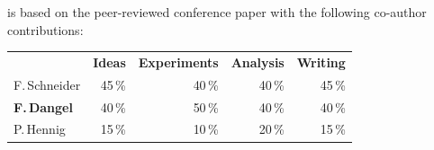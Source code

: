 \begin{disclaimer}
   is based on the peer-reviewed
  conference paper with the following co-author contributions:

   \cite{schneider2021cockpit}

  \vspace{-1.75ex}

  \begin{center}
    \begin{tabular}[!h]{lrrrr}
      & \textbf{Ideas} & \textbf{Experiments} & \textbf{Analysis} & \textbf{Writing}
      \\
      F.\,Schneider & 45\,\%& 40\,\% & 40\,\% & 45\,\%
      \\
      \textbf{F.\,Dangel} & 40\,\% & 50\,\% & 40\,\% & 40\,\%
      \\
      P.\,Hennig & 15\,\% & 10\,\% & 20\,\% & 15\,\%
    \end{tabular}
  \end{center}
\end{disclaimer}

